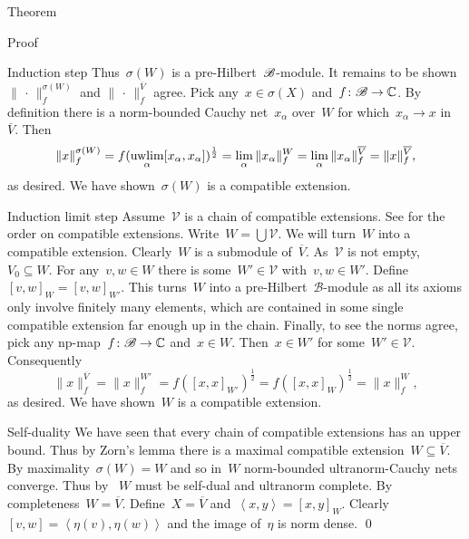 \documentclass[b]{subfiles}
\begin{document}
\begin{parsec}
\begin{point}{Theorem}
\begin{point}{Proof}
\begin{point}{Induction step}
Thus~$\sigma(W)$ is a pre-Hilbert~$\mathscr{B}$-module.
It remains to be shown~$\|\,\cdot\,\|_f^{\sigma(W)}$
    and $\|\,\cdot\,\|_f^{\overline{V}}$
    agree.
Pick any~$x \in \sigma(X)$ and~$f\colon \mathscr{B} \to \mathbb{C}$.
By definition there is a norm-bounded Cauchy net~$x_\alpha$ over~$W$
    for which~$x_\alpha \to x$ in~$\overline{V}$.
Then
\begin{equation*}
    \|x\|^{\sigma(W)}_f
        = f(\uwlim_\alpha [x_\alpha,x_\alpha])^{\frac{1}{2}}
        = \lim_\alpha \|x_\alpha\|_f^W
        = \lim_\alpha \|x_\alpha\|_f^{\overline{V}}
        = \|x\|_f^{\overline{V}},
\end{equation*}
as desired.
We have shown~$\sigma(W)$ is a compatible extension.
\end{point}
\begin{point}{Induction limit step}%
    Assume~$\mathscr{V}$
        is a chain of compatible extensions.
        See  for the order on compatible extensions.
    Write~$W = \bigcup \mathscr{V}$.
    We will turn~$W$ into a compatible extension.
    Clearly~$W$ is a submodule of~$\overline{V}$.
    As~$\mathscr{V}$ is not empty, $V_0 \subseteq W$.
    For any~$v,w \in W$
    there is some~$W' \in \mathscr{V}$ with~$v,w \in W'$.
    Define~$[v,w]_W = [v,w]_{W'}$.
    This turns~$W$ into a pre-Hilbert~$\mathscr{B}$-module
        as all its axioms only involve finitely many elements,
        which are contained in some single compatible extension far enough up
        in the chain.
    Finally, to see the norms agree,
        pick any np-map~$f\colon \mathscr{B} \to \mathbb{C}$
        and~$x \in W$.
    Then~$x \in W'$ for some~$W' \in \mathscr{V}$.
    Consequently
    \begin{equation*}
        \|x\|^{\overline{V}}_f
        = \|x\|^{W'}_f
        = f([x,x]_{W'})^{\frac{1}{2}}
        = f([x,x]_{W})^{\frac{1}{2}}
        = \|x\|^{W}_f,
    \end{equation*}
    as desired.  We have shown~$W$ is a compatible extension.
\end{point}
\begin{point}{Self-duality}
    We have seen
        that every chain of compatible extensions
        has an upper bound.
    Thus by Zorn's lemma there is a maximal compatible
        extension~$W\subseteq \overline{V}$.
    By maximality~$\sigma(W) = W$
        and so in~$W$ norm-bounded ultranorm-Cauchy nets converge.
    Thus by~
        $W$ must be self-dual and ultranorm complete.
    By completeness~$W = \overline{V}$.
    Define~$X = \overline{V}$
        and~$\left<x,y\right> = [x,y]_{W}$.
    Clearly~$[v,w] = \left<\eta(v),\eta(w)\right>$
        and the image of~$\eta$ is norm dense. \qed
\end{point}
\end{point}
\end{point}
\end{parsec}
\end{document}
